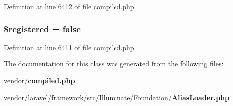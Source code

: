 Definition at line 6412 of file compiled.\+php.

\subsubsection[{\$registered}]{\setlength{\rightskip}{0pt plus 5cm}\$registered = false\hspace{0.3cm}{\ttfamily [protected]}}\label{class_illuminate_1_1_foundation_1_1_alias_loader_a4832303f9bd07af05f1ec6874de46716}


Definition at line 6411 of file compiled.\+php.



The documentation for this class was generated from the following files\+:\begin{DoxyCompactItemize}
\item 
vendor/{\bf compiled.\+php}\item 
vendor/laravel/framework/src/\+Illuminate/\+Foundation/{\bf Alias\+Loader.\+php}\end{DoxyCompactItemize}
